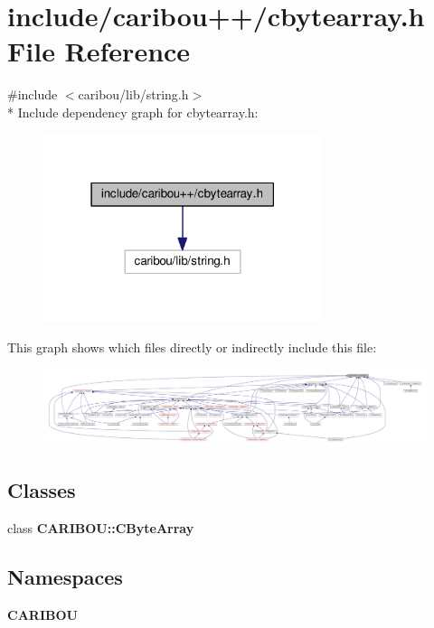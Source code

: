 \section{include/caribou++/cbytearray.h File Reference}
\label{cbytearray_8h}
{\ttfamily \#include $<$caribou/lib/string.\+h$>$}\\*
Include dependency graph for cbytearray.\+h\+:
\nopagebreak
\begin{figure}[H]
\begin{center}
\leavevmode
\includegraphics[width=231pt]{cbytearray_8h__incl}
\end{center}
\end{figure}
This graph shows which files directly or indirectly include this file\+:
\nopagebreak
\begin{figure}[H]
\begin{center}
\leavevmode
\includegraphics[width=350pt]{cbytearray_8h__dep__incl}
\end{center}
\end{figure}
\subsection*{Classes}
\begin{DoxyCompactItemize}
\item 
class {\bf C\+A\+R\+I\+B\+O\+U\+::\+C\+Byte\+Array}
\end{DoxyCompactItemize}
\subsection*{Namespaces}
\begin{DoxyCompactItemize}
\item 
 {\bf C\+A\+R\+I\+B\+OU}
\end{DoxyCompactItemize}
